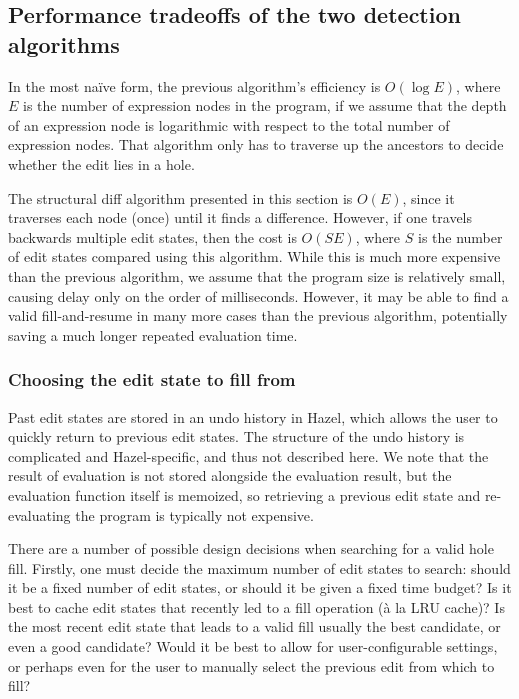 \subsection{Performance tradeoffs of the two detection algorithms}
\label{sec:far-detect-compare}

In the most na\"ive form, the previous algorithm's efficiency is $O(\log E)$, where $E$ is the number of expression nodes in the program, if we assume that the depth of an expression node is logarithmic with respect to the total number of expression nodes. That algorithm only has to traverse up the ancestors to decide whether the edit lies in a hole.

The structural diff algorithm presented in this section is $O(E)$, since it traverses each node (once) until it finds a difference. However, if one travels backwards multiple edit states, then the cost is $O(SE)$, where $S$ is the number of edit states compared using this algorithm. While this is much more expensive than the previous algorithm, we assume that the program size is relatively small, causing delay only on the order of milliseconds. However, it may be able to find a valid fill-and-resume in many more cases than the previous algorithm, potentially saving a much longer repeated evaluation time.

\subsubsection{Choosing the edit state to fill from}
\label{sec:far-past-edit-states}

Past edit states are stored in an undo history in Hazel, which allows the user to quickly return to previous edit states. The structure of the undo history is complicated and Hazel-specific, and thus not described here. We note that the result of evaluation is not stored alongside the evaluation result, but the evaluation function itself is memoized, so retrieving a previous edit state and re-evaluating the program is typically not expensive.


There are a number of possible design decisions when searching for a valid hole fill. Firstly, one must decide the maximum number of edit states to search: should it be a fixed number of edit states, or should it be given a fixed time budget? Is it best to cache edit states that recently led to a fill operation (\`a la LRU cache)? Is the most recent edit state that leads to a valid fill usually the best candidate, or even a good candidate? Would it be best to allow for user-configurable settings, or perhaps even for the user to manually select the previous edit from which to fill?


